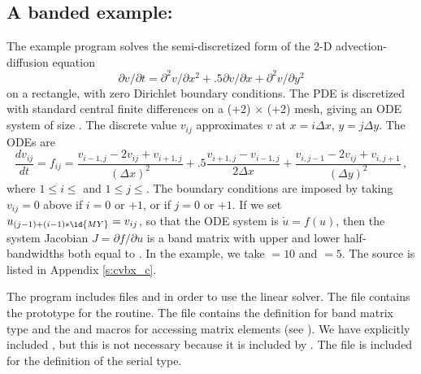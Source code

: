 

\subsection{A banded example: }\label{ss:cvbx}

The example program  solves the semi-discretized form of
the 2-D advection-diffusion equation
\vspace*{-.1in}
\begin{equation}
\label{eq:adeqn}
\partial v / \partial t = \partial^2 v / \partial x^2
  + .5 \partial v / \partial x + \partial^2 v / \partial y^2
\end{equation}
on a rectangle, with zero Dirichlet boundary conditions. The PDE is 
discretized with standard central finite differences on a 
(+2) $\times$ (+2) mesh, giving an ODE system of size
.  The discrete value $v_{ij}$ approximates $v$ at $x = i \Delta x$,
$y = j \Delta y$. The ODEs are
\begin{equation}
\label{eq:cdiff}
\frac{dv_{ij}}{dt} = f_{ij} =
         \frac{v_{i-1,j} - 2 v_{ij} + v_{i+1,j}}{(\Delta x)^2}
       + .5  \frac{v_{i+1,j} - v_{i-1,j}}{2 \Delta x}
       + \frac{v_{i,j-1} - 2 v_{ij} + v_{i,j+1}}{(\Delta y)^2} \, ,
\end{equation}
where $1 \leq i \leq $ and $1 \leq j \leq $.  The boundary
conditions are imposed by taking $v_{ij} = 0$ above if $i = 0$
or $ + 1$, or if $j = 0$ or $ + 1$. 
If we set $u_{(j-1)+(i-1)*\id{MY}} = v_{ij}$, so that the ODE system is
$\dot{u} = f(u)$, then the system Jacobian $J = \partial f / \partial u$ is
a band matrix with upper and lower half-bandwidths both equal to .
In the example, we take  $= 10$ and  $= 5$.
The source is listed in Appendix \ref{s:cvbx_c}.

The  program includes files  and
 in order to use the {\cvband} linear solver. The 
file contains the prototype for the  routine. The 
file contains the definition for band matrix type  and the
 and  macros for accessing matrix
elements (see ).
We have explicitly included , but this is not necessary because
it is included by .  The file  is
included for the definition of the serial  type.

